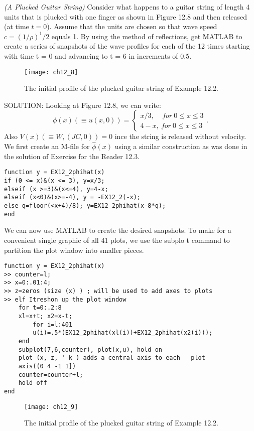 \documentclass[../main.tex]{subfiles}
\begin{document}
\textit{(A Plucked Guitar String)} 
Consider what happens to a guitar string of length 4 units that is plucked with one finger as shown in Figure 12.8 and then released (at time  $t = 0$). Assume that the units are chosen so that wave speed $ c=(1/ \rho )^1/2 $ equals 1. By using the method of reflections, get MATLAB to create a series of snapshots of the wave profiles for each of the 12 times starting with time t = 0 and advancing to t = 6 in increments of 0.5. 
\begin{figure}[H]
	\centering
	\texttt{[image: ch12\_8]}
	\caption{\textsf{ The initial profile of the plucked guitar string of Example 12.2.}}
	\label{pfig:ch12_8}
\end{figure}
SOLUTION: Looking at Figure 12.8, we can write: 
$$
\phi(x) (\equiv u(x,0)) =
\begin{cases}
x/3, ~~~~~for~ 0 \leqslant x \leqslant 3 \\
4 - x, ~for~ 0\leqslant x \leqslant 3 
\end{cases} .
$$
Also $V(x)(\equiv W,(JC,0)) = 0$ ince the string is released without velocity. We first 
create an M-file for $ \hat{\phi}(x)$ using a similar construction as was done in the solution 
of Exercise for the Reader 12.3. 
\begin{verbatim}
function y = EX12_2phihat(x) 
if (0 <= x)&(x <= 3), y=x/3; 
elseif (x >=3)&(x<=4), y=4-x; 
elseif (x<0)&(x>=-4), y = -EX12_2(-x); 
else q=floor(<x+4)/8); y=EX12_2phihat(x-8*q); 
end 
\end{verbatim}
We can now use MATLAB to create the desired snapshots. To make for a 
convenient single graphic of all 41 plots, we use the subplo t command to 
partition the plot window into smaller pieces. 
\\
\begin{lstlisting}[numbers=none,frame=none]
function y = EX12_2phihat(x) 
>> counter=l; 
>> x=0:.01:4; 
>> z=zeros (size (x) ) ; will be used to add axes to plots 
>> elf Itreshon up the plot window 
	for t=0:.2:8 
	xl=x+t; x2=x-t; 
		for i=l:401 
		u(i)=.5*(EX12_2phihat(xl(i))+EX12_2phihat(x2(i))); 
	end 
	subplot(7,6,counter), plot(x,u), hold on 
	plot (x, z, ' k ) adds a central axis to each 	plot 
	axis((0 4 -1 1]) 
	counter=counter+l; 
	hold off 
end
\end{lstlisting}
\begin{figure}[H]
	\centering
	\texttt{[image: ch12\_9]}
	\caption{\textsf{ The initial profile of the plucked guitar string of Example 12.2.}}
	\label{pfig:ch12_9}
\end{figure}
\end{document}
